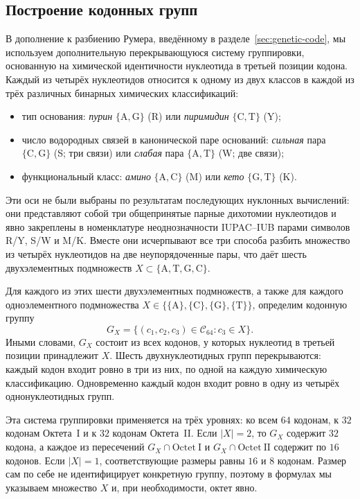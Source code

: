 \documentclass[11pt,a4paper]{article}
\renewcommand{\_}{\origunderscore\allowbreak}
\begin{document}
\subsection{Построение кодонных групп}
\label{sec:partitioning}

В дополнение к разбиению Румера, введённому в
разделе~\ref{sec:genetic-code}, мы используем дополнительную
перекрывающуюся систему группировки, основанную на химической
идентичности нуклеотида в третьей позиции кодона. Каждый из четырёх
нуклеотидов относится к одному из двух классов в каждой из трёх
различных бинарных химических классификаций:
\begin{itemize}
  \item тип основания: \emph{пурин}
        $\{\mathrm{A},\mathrm{G}\}$ (R) или \emph{пиримидин}
        $\{\mathrm{C},\mathrm{T}\}$ (Y);
  \item число водородных связей в канонической паре оснований:
        \emph{сильная} пара $\{\mathrm{C},\mathrm{G}\}$ (S; три
        связи) или \emph{слабая} пара
        $\{\mathrm{A},\mathrm{T}\}$ (W; две связи);
  \item функциональный класс: \emph{амино}
        $\{\mathrm{A},\mathrm{C}\}$ (M) или \emph{кето}
        $\{\mathrm{G},\mathrm{T}\}$ (K).
\end{itemize}
Эти оси не были выбраны по результатам последующих нуклонных
вычислений: они представляют собой три общепринятые парные
дихотомии нуклеотидов и явно закреплены в номенклатуре
неоднозначности IUPAC--IUB парами символов
R/Y, S/W и M/K. Вместе они исчерпывают все три способа
разбить множество из четырёх нуклеотидов на две
неупорядоченные пары, что даёт шесть двухэлементных
подмножеств
$X \subset \{\mathrm{A}, \mathrm{T}, \mathrm{G}, \mathrm{C}\}$.

Для каждого из этих шести двухэлементных подмножеств, а также для
каждого одноэлементного подмножества
$X\in\{\{\mathrm{A}\},\{\mathrm{C}\},\{\mathrm{G}\},
\{\mathrm{T}\}\}$, определим кодонную группу
\[
G_X =
\{(c_1,c_2,c_3)\in\mathcal{C}_{64}
  : c_3\in X\}.
\]
Иными словами, $G_X$ состоит из всех кодонов, у которых нуклеотид
в третьей позиции принадлежит $X$. Шесть двухнуклеотидных групп
перекрываются: каждый кодон входит ровно в три из них, по одной на
каждую химическую классификацию. Одновременно каждый кодон входит
ровно в одну из четырёх однонуклеотидных групп.

Эта система группировки применяется на трёх уровнях: ко всем
$64$ кодонам, к $32$ кодонам Октета~I и к $32$ кодонам
Октета~II. Если $|X|=2$, то $G_X$ содержит $32$ кодона, а каждое
из пересечений $G_X\cap\mathrm{Octet~I}$ и
$G_X\cap\mathrm{Octet~II}$ содержит по $16$ кодонов. Если
$|X|=1$, соответствующие размеры равны $16$ и $8$ кодонам.
Размер сам по себе не идентифицирует конкретную группу, поэтому
в формулах мы указываем множество $X$ и, при необходимости,
октет явно.
\end{document}
